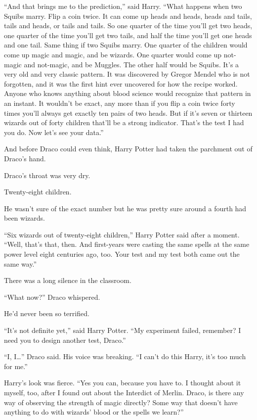 “And that brings me to the prediction,” said Harry. “What happens when two
Squibs marry. Flip a coin twice. It can come up heads and heads, heads and
tails, tails and heads, or tails and tails. So one quarter of the time you’ll
get two heads, one quarter of the time you’ll get two tails, and half the time
you’ll get one heads and one tail. Same thing if two Squibs marry. One quarter
of the children would come up magic and magic, and be wizards. One quarter
would come up not-magic and not-magic, and be Muggles. The other half would be
Squibs. It’s a very old and very classic pattern. It was discovered by Gregor
Mendel who is not forgotten, and it was the first hint ever uncovered for how
the recipe worked. Anyone who knows anything about blood science would
recognize that pattern in an instant. It wouldn’t be exact, any more than if
you flip a coin twice forty times you’ll always get exactly ten pairs of two
heads. But if it’s seven or thirteen wizards out of forty children that’ll be a
strong indicator. That’s the test I had you do. Now let’s see your data.”

And before Draco could even think, Harry Potter had taken the parchment out of
Draco’s hand.

Draco’s throat was very dry.

Twenty-eight children.

He wasn’t sure of the exact number but he was pretty sure around a fourth had
been wizards.

“Six wizards out of twenty-eight children,” Harry Potter said after a moment.
“Well, that’s that, then. And first-years were casting the same spells at the
same power level eight centuries ago, too. Your test and my test both came out
the same way.”

There was a long silence in the classroom.

“What now?” Draco whispered.

He’d never been so terrified.

“It’s not definite yet,” said Harry Potter. “My experiment failed, remember? I
need you to design another test, Draco.”

“I, I…” Draco said. His voice was breaking. “I can’t do this Harry, it’s
too much for me.”

Harry’s look was fierce. “Yes you can, because you have to. I thought about it
myself, too, after I found out about the Interdict of Merlin. Draco, is there
any way of observing the strength of magic directly? Some way that doesn’t have
anything to do with wizards’ blood or the spells we learn?”

